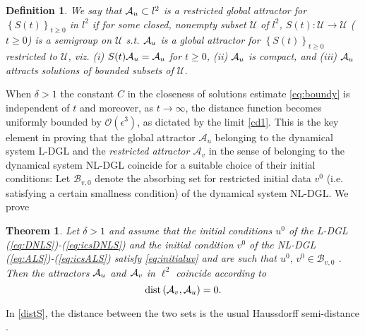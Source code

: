 \documentclass[preprintnumbers,amsmath,amssymb]{revtex4}
\newtheorem{definition}{Definition}[section]
\newtheorem{theorem}{Theorem}[section]
\begin{document}
\begin{enumerate}
\begin{definition}
	\label{RGAu3}
We say that ${\cal A}_u\subset l^2$ is a restricted global attractor for  $\left\{S(t)\right\}_{t\ge 0}$
	in $l^2$ if for some closed, nonempty subset $\mathcal{U}$
	of $l^2$, $S(t):\mathcal{U}\rightarrow \mathcal{U}$ ($t\ge 0$) is a  semigroup on $\mathcal{U}$ s.t. ${\cal A}_u$ is a global attractor for $\left\{S(t)\right\}_{t\ge 0}$
	restricted to $\mathcal{U}$, viz. (i) $S(t){\cal A}_u={\cal A}_u$ for $t\ge 0$, (ii) ${\cal A}_u$ is compact, and (iii) ${\cal A}_u$ attracts solutions of bounded subsets of $\mathcal{U}$.
\end{definition}

When $\delta>1$ the constant $C$ in the closeness of solutions estimate \eqref{eq:boundy} is independent of $t$ and moreover, as $t\rightarrow\infty$, the distance function becomes uniformly bounded by $\mathcal{O}(\epsilon^3)$, as dictated by the limit \eqref{cd1}.  This is the key element in proving that the global attractor $\mathcal{A}_u$ belonging to the dynamical system L-DGL and the {\em restricted attractor $\mathcal{A}_v$} in the sense of \cite{Hale} belonging to the dynamical system NL-DGL coincide for a suitable choice of their initial conditions: Let $\mathcal{B}_{v,0}$  denote the absorbing set for restricted initial data $v^0$ (i.e. satisfying a certain smallness condition) of the dynamical system  NL-DGL. We prove
\begin{theorem}
	Let $\delta>1$ and assume that the initial conditions $u^0$ of the L-DGL (\ref{eq:DNLS})-(\ref{eq:icsDNLS}) and the initial condition $v^0$ of the NL-DGL  (\ref{eq:ALS})-(\ref{eq:icsALS}) satisfy  \eqref{eq:initialuv}  and are such that $u^0,\,v^0\in \mathcal{B}_{v,0}$ . Then the  attractors
	${\cal A}_u$ and ${\cal A}_v$ in $\ell^2$ coincide according to
	\begin{equation}
	\label{distS}
	{\rm dist}\left({\cal A}_v,{\cal A}_u\right)=0. 
	\end{equation}\label{Theorem:congruence}
\end{theorem}
\end{enumerate}
In \eqref{distS}, the distance between the two sets is the usual Haussdorff semi-distance \cite{Temam}. 
\end{document}
